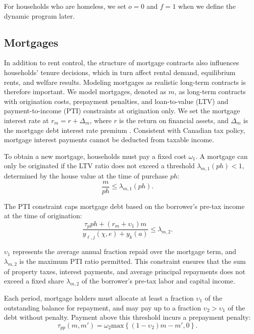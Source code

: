 \documentclass[parskip=full]{article}
\begin{document}
For households who are homeless, we set $o=0$ and $f=1$ when we define the dynamic program later.

\subsection{Mortgages}\label{subsection:morgtages}

In addition to rent control, the structure of mortgage contracts also influences households' tenure decisions, which in turn affect rental demand, equilibrium rents, and welfare results. Modeling mortgages as realistic long-term contracts is therefore important. We model mortgages, denoted as $m$, as long-term contracts with origination costs, prepayment penalties, and loan-to-value (LTV) and payment-to-income (PTI) constraints at origination only. We set the mortgage interest rate at $r_{m}=r+\Delta_m$, where $r$ is the return on financial assets, and $\Delta_m$ is the mortgage debt interest rate premium \citep{sommeretal-2013,sommersullivan-2017,kaplanetal-2019}. Consistent with Canadian tax policy, mortgage interest payments cannot be deducted from taxable income.

To obtain a new mortgage, households must pay a fixed cost $\omega_{1}$. A mortgage can only be originated if the LTV ratio does not exceed a threshold $\lambda_{m,1}(ph)<1$, determined by the house value at the time of purchase $ph$:
\begin{equation}\label{eq:LTV}
\frac{m}{p h} \leq \lambda_{m,1}(ph).
\end{equation}

\noindent The PTI constraint caps mortgage debt based on the borrower's pre-tax income at the time of origination: 
\begin{equation}\label{eq:PTI}
\frac{\tau_{p}ph+(r_{m}+\upsilon_{1})m}{y_{\ell,j}(\chi,e)+y_{k}(a)} \leq \lambda_{m,2}.
\end{equation}

\noindent $\upsilon_{1}$ represents the average annual fraction repaid over the mortgage term, and $\lambda_{m,2}$ is the maximum PTI ratio permitted. This constraint ensures that the sum of property taxes, interest payments, and average principal repayments does not exceed a fixed share $\lambda_{m,2}$ of the borrower's pre-tax labor and capital income.

Each period, mortgage holders must allocate at least a fraction $\upsilon_{1}$ of the outstanding balance for repayment, and may pay up to a fraction $\upsilon_{2}>\upsilon_{1}$ of the debt without penalty. Payment above this threshold incurs a prepayment penalty:
\begin{equation}\label{eq:prepayment_penalty}
\tau_{pp}(m,m')=\omega_{2}\mbox{max}\left\{(1-\upsilon_{2})m-m',0\right\}.
\end{equation}
\end{document}
